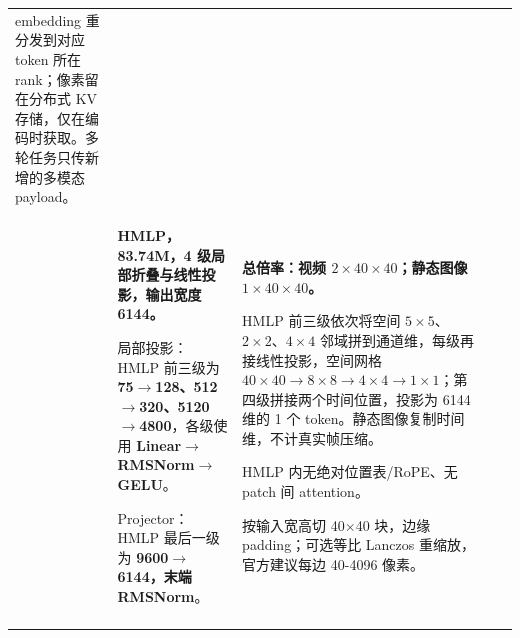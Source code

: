 \begin{longtable}{@{}P{0.130\dimexpr\textwidth-40pt\relax}P{0.235\dimexpr\textwidth-40pt\relax}P{0.300\dimexpr\textwidth-40pt\relax}P{0.245\dimexpr\textwidth-40pt\relax}P{0.090\dimexpr\textwidth-40pt\relax}@{}}
embedding 重分发到对应 token 所在 rank；像素留在分布式 KV 存储，仅在编码时获取。多轮任务只传新增的多模态 payload。 \\
 & {\bfseries HMLP，83.\allowbreak{}74M，4 级局部折叠与线性投影，输出宽度 6144。}\par\vspace{1pt}局部投影：HMLP 前三级为 {\bfseries 75\(\rightarrow\)128、512\(\rightarrow\)320、5120\(\rightarrow\)4800}，各级使用 {\bfseries Linear\(\rightarrow\)RMSNorm\(\rightarrow\)GELU}。\par\vspace{1pt}Projector：HMLP 最后一级为 {\bfseries 9600\(\rightarrow\)6144，末端 RMSNorm}。 & {\bfseries 总倍率：视频 \(2\times 40\times 40\)；静态图像 \(1\times 40\times 40\)。}\par{}HMLP 前三级依次将空间 \(5\times 5\)、\(2\times 2\)、\(4\times 4\) 邻域拼到通道维，每级再接线性投影，空间网格 \(40\times 40\rightarrow 8\times 8\rightarrow 4\times 4\rightarrow 1\times 1\)；第四级拼接两个时间位置，投影为 6144 维的 1 个 token。静态图像复制时间维，不计真实帧压缩。\par\vspace{1pt}{\bfseries 位置：}HMLP 内无绝对位置表/\allowbreak{}RoPE、无 patch 间 attention。\par\vspace{1pt}{\bfseries 动态分辨率：是。} 按输入宽高切 40\(\times\)40 块，边缘 padding；可选等比 Lanczos 重缩放，官方建议每边 40-4096 像素。 & \textemdash{}\textemdash{} & \textemdash{}\textemdash{} \\
\addlinespace[6pt]

\end{longtable}
